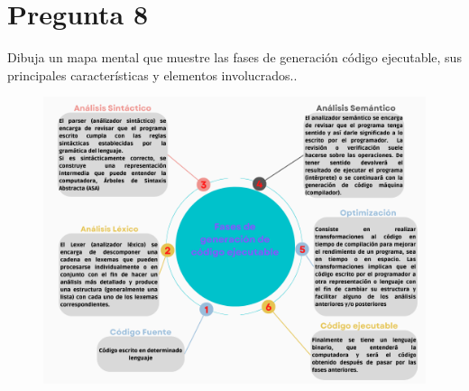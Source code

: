 \newpage
\section*{Pregunta 8}
\Large 
Dibuja un mapa mental que muestre las fases de generación código ejecutable, sus principales características y elementos involucrados..\\
\newline
\large
\begin{figure}[h!]
	\centering
	\includegraphics[scale=0.71]{Mapa.png}
\end{figure}